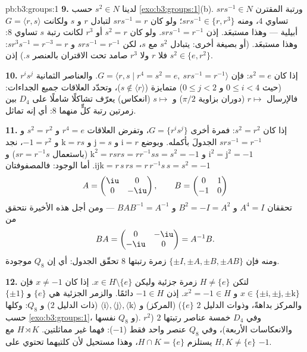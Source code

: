 \begin{solution}{pb:b3:groups:1}
\textbf{9.} لدينا $s^2 \in N$ حسب \cref{exo:b3:groups:1}(b). ورتبة المقترن
$srs^{-1} \in N$ تساوي $4$، ومنه $srs^{-1} \in \{r,
r^3\}$؛ ولو كان
$srs^{-1} = r$ لتبادل $r$ و $s$ ولكانت $G =
\langle r, s\rangle$ أبيلية --- وهذا
مستبعَد. إذن $srs^{-1} =
r^{-1}$. ولو كان $s^2 = r$ أو $r^3$ لكانت رتبة $s$
تساوي $8$: وهذا مستبعَد. (أو بصيغة أخرى: يتبادل $s^2$ مع $s$،
لكن $s r s^{-1} =
r^{-1}$ و $s r^3 s^{-1} = r^{-3} = r$: فلا $r$ ولا $r^3$ صامد تحت الاقتران بالعنصر $s$.) إذن $s^2 \in \{e, r^2\}$.

\textbf{10.} إذا كان $s^2 = e$: فإن $G = \langle r, s \mid r^4 = s^2 = e,\
srs^{-1} = r^{-1}\rangle$. والعناصر الثمانية
$r^is^j$ (حيث $0 \leq i
< 4$ و $0 \leq j < 2$) متمايزة ($s \notin \langle r\rangle$)،
وتحدّد العلاقات جميع الجداءات: فالإرسال $r
\mapsto$ (دوران بزاوية
$\pi/2$) و $s \mapsto$ (انعكاس) يعرّف تشاكلًا شاملًا على $D_4$
بين زمرتين رتبة كلٍّ منهما $8$: أي إنه تماثل.

\textbf{11.} إذا كان $s^2 = r^2$: فمرة أخرى $G = \{r^i s^j\}$، وتفرض
العلاقات $r^4 = e$ و $s^2 = r^2$ و $srs^{-1} = r^{-1}$ الجدولَ بأكمله. وبوضع
$\mathrm i = r$ و $\mathrm j = s$ و $\mathrm k =
rs$ و $-1 = r^2$، نجد
$\mathrm i^2 = \mathrm j^2 = -1$ و $\mathrm k^2 =
rsrs = r r^{-1} s s = s^2 = -1$ (باستعمال $sr = r^{-1}s$) و $\mathrm i \mathrm j \mathrm k = r\,s\,rs = r\,r^{-1}s\,s = s^2 =
-1$. أما
الوجود: فالمصفوفتان
\[
A = \begin{pmatrix} \iu & 0\\ 0 & -\iu \end{pmatrix},
\qquad
B = \begin{pmatrix} 0 & 1\\ -1 & 0 \end{pmatrix}
\]
تحققان $A^4 = I$ و $B^2 = -I = A^2$ و $BAB^{-1} = A^{-1}$ --- ومن أجل هذه
الأخيرة نتحقق من
\[
BA = \begin{pmatrix} 0 & -\iu\\ -\iu & 0 \end{pmatrix} = A^{-1}B .
\]
ومنه فإن $\{\pm I, \pm A, \pm B, \pm AB\}$ زمرة رتبتها $8$ تحقّق الجدول: أي إن $Q_8$
موجودة.

\textbf{12.} لتكن $H \neq \{e\}$ زمرة جزئية وليكن $x \in H
\setminus \{e\}$. إذا
كان $x \neq -1$ فإن $x \in \{\pm\mathrm i,
\pm\mathrm j, \pm\mathrm k\}$ و $x^2 = -1 \in H$. إذن $-1 \in H$
دائمًا. والزمر الجزئية هي $\{e\}$ و $\{\pm 1\}$ (المركز)
و $\langle \mathrm i\rangle, \langle \mathrm j\rangle, \langle
\mathrm k\rangle$ (ذات الدليل $2$) و $Q_8$: وكلها  ($\{e\}$
والمركز بداهةً، وذوات الدليل $2$ حسب \cref{exo:b3:groups:1}، و $Q_8$
نفسها). وفي $D_4$ خمسة عناصر رتبتها $2$ ($r^2$ والانعكاسات
الأربعة)، وفي $Q_8$ عنصر واحد فقط ($-1$): فهما غير مماثلتين.
 $H \rtimes K$ مع $H, K \neq \{e\}$ يستلزم $H \cap K =
\{e\}$،
وهذا مستحيل لأن كلتيهما تحتوي على $-1$.


\end{solution}
